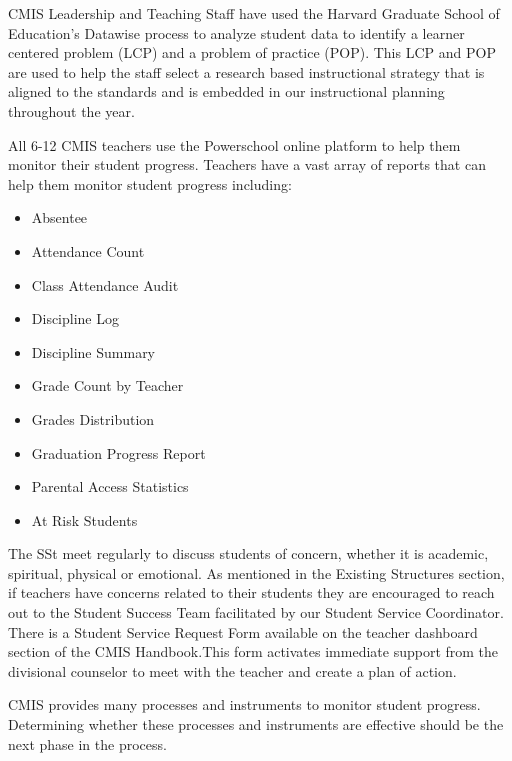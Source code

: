 \begin{findings}

CMIS Leadership and Teaching Staff have used the Harvard Graduate School of Education’s Datawise process to analyze student data to identify a learner centered problem (LCP) and a problem of practice (POP). This LCP and POP are used to help the staff select a research based instructional strategy that is aligned to the standards and is embedded in our instructional planning  throughout the year. 

 
All 6-12 CMIS teachers use the Powerschool online platform to help them monitor their student progress. Teachers have a vast array of reports that can help them monitor student progress including: 

\begin{itemize}
\item Absentee	
\item Attendance Count	
\item Class Attendance Audit
\item Discipline Log	
\item Discipline Summary
\item Grade Count by Teacher	
\item Grades Distribution	
\item Graduation Progress Report 
\item Parental Access Statistics
\item At Risk Students	
\end{itemize}


The SSt meet regularly to discuss students of concern, whether it is academic, spiritual, physical or emotional. As mentioned in the Existing Structures section, if teachers have concerns related to their students they are encouraged to reach out to the Student Success Team facilitated by our Student Service Coordinator. There is a Student Service Request Form available on the teacher dashboard section of the CMIS Handbook.This form activates immediate support from the divisional counselor to meet with the teacher and create a plan of action.


CMIS provides many processes and instruments to monitor student progress. Determining whether these processes and instruments are effective should be the next phase in the process. 
\end{findings}

